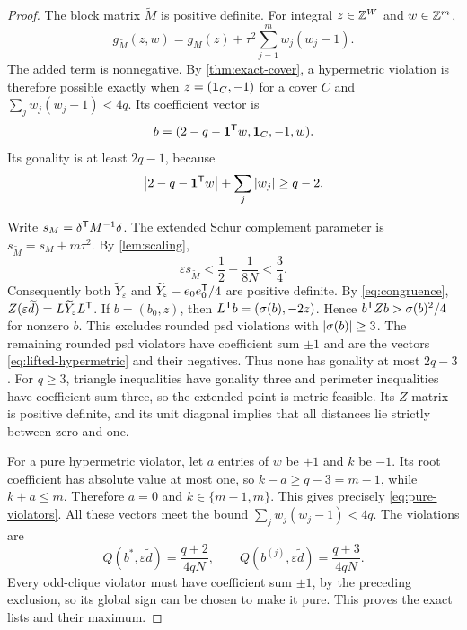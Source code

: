 \begin{proof}
The block matrix $\widetilde M$ is positive definite. For integral
$z\in\mathbb Z^W$ and $w\in\mathbb Z^m$,
\begin{equation}\label{eq:orthogonal-lift}
 g_{\widetilde M}(z,w)=g_M(z)+\tau^2\sum_{j=1}^m w_j(w_j-1).
\end{equation}
The added term is nonnegative. By \cref{thm:exact-cover}, a hypermetric
violation is therefore possible exactly when
$z=(\mathbf 1_C,-1)$ for a cover $C$ and
$\sum_jw_j(w_j-1)<4q$.
Its coefficient vector is
\begin{equation}\label{eq:lifted-hypermetric}
 b=(2-q-\mathbf 1^{\mathsf T} w,\mathbf 1_C,-1,w).
\end{equation}
Its gonality is at least $2q-1$, because
\[
 \left\lvert 2-q-\mathbf 1^{\mathsf T} w\right\rvert+\sum_j\left\lvert w_j\right\rvert\geq q-2.
\]

Write $s_M=\delta^{\mathsf T} M^{-1}\delta$.
The extended Schur complement parameter is
$s_{\widetilde M}=s_M+m\tau^2$. By \cref{lem:scaling},
\[
 \varepsilon s_{\widetilde M}<\frac12+\frac1{8N}<\frac34.
\]
Consequently both $\widetilde Y_\varepsilon$ and
$\widetilde Y_\varepsilon-e_0e_0^{\mathsf T}/4$ are positive definite.
By \eqref{eq:congruence},
$Z(\varepsilon\widetilde d)=L\widetilde Y_\varepsilon L^{\mathsf T}$.
If $b=(b_0,z)$, then $L^{\mathsf T} b=(\sigma(b),-2z)$.
Hence $b^{\mathsf T} Zb>\sigma(b)^2/4$ for nonzero $b$.
This excludes rounded psd violations with $\left\lvert \sigma(b)\right\rvert\geq3$.
The remaining rounded psd violators have coefficient sum $\pm1$ and
are the vectors \eqref{eq:lifted-hypermetric} and their negatives.
Thus none has gonality at most $2q-3$.
For $q\geq3$, triangle inequalities have gonality three and perimeter
inequalities have coefficient sum three, so the extended point is metric
feasible. Its $Z$ matrix is positive definite, and its unit diagonal
implies that all distances lie strictly between zero and one.

For a pure hypermetric violator, let $a$ entries of $w$ be $+1$ and $k$
be $-1$. Its root coefficient has absolute value at most one, so
$k-a\geq q-3=m-1$, while $k+a\leq m$. Therefore $a=0$ and
$k\in\{m-1,m\}$. This gives precisely \eqref{eq:pure-violators}.
All these vectors meet the bound $\sum_jw_j(w_j-1)<4q$.
The violations are
\[
 Q(b^*,\varepsilon\widetilde d)=\frac{q+2}{4qN},\qquad
 Q(b^{(j)},\varepsilon\widetilde d)=\frac{q+3}{4qN}.
\]
Every odd-clique violator must have coefficient sum $\pm1$, by the
preceding exclusion, so its global sign can be chosen to make it pure.
This proves the exact lists and their maximum.


\end{proof}
